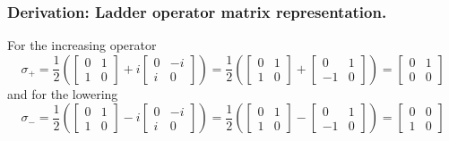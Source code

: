 \documentclass[../../../main.tex]{subfiles}
\begin{document}
\subsubsection{Derivation: Ladder operator matrix representation.}
For the increasing operator
\begin{equation*}
    \sigma_+
    = \frac{1}{2} \left( \begin{bmatrix} 0 & 1 \\ 1 & 0 \end{bmatrix} + i \begin{bmatrix} 0 & -i \\ i & 0 \end{bmatrix} \right)
    = \frac{1}{2} \left( \begin{bmatrix} 0 & 1 \\ 1 & 0 \end{bmatrix} + \begin{bmatrix} 0 & 1 \\ -1 & 0 \end{bmatrix}\right)
    = \begin{bmatrix} 0 & 1 \\ 0 & 0 \end{bmatrix}
\end{equation*}
and for the lowering
\begin{equation*}
    \sigma_-
    = \frac{1}{2} \left( \begin{bmatrix} 0 & 1 \\ 1 & 0 \end{bmatrix} - i \begin{bmatrix} 0 & -i \\ i & 0 \end{bmatrix} \right)
    = \frac{1}{2} \left( \begin{bmatrix} 0 & 1 \\ 1 & 0 \end{bmatrix} - \begin{bmatrix} 0 & 1 \\ -1 & 0 \end{bmatrix}\right)
    = \begin{bmatrix} 0 & 0 \\ 1 & 0 \end{bmatrix}
\end{equation*}
\end{document}

